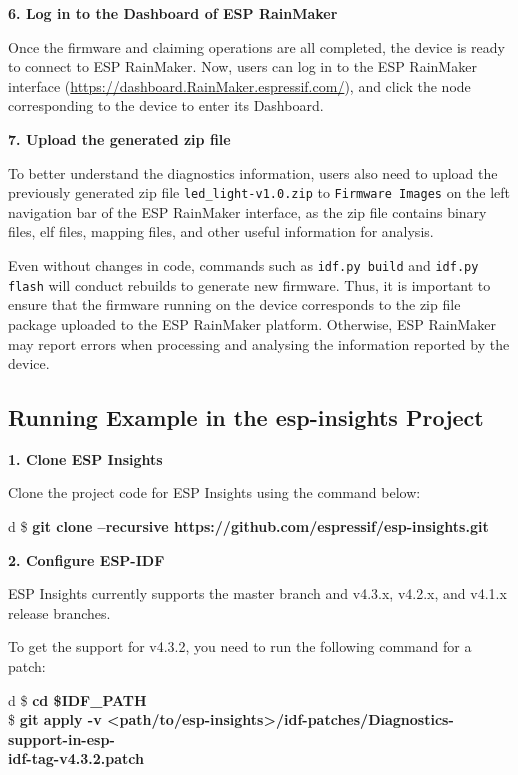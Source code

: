 \documentclass[a4paper,12pt]{book}
\begin{document}
\textbf{6. Log in to the Dashboard of ESP RainMaker}

Once the firmware and claiming operations are all completed, the device is ready to connect to ESP RainMaker. Now, users can log in to the ESP RainMaker interface (\url{https://dashboard.RainMaker.espressif.com/}), and click the node corresponding to the device to enter its Dashboard.

\textbf{7. Upload the generated zip file}

To better understand the diagnostics information, users also need to upload the previously generated zip file \verb|led_light-v1.0.zip| to \verb|Firmware Images| on the left navigation bar of the ESP RainMaker interface, as the zip file contains binary files, elf files, mapping files, and other useful information for analysis.

Even without changes in code, commands such as \verb|idf.py build| and \verb|idf.py flash| will conduct rebuilds to generate new firmware. Thus, it is important to ensure that the firmware running on the device corresponds to the zip file package uploaded to the ESP RainMaker platform. Otherwise, ESP RainMaker may report errors when processing and analysing the information reported by the device.

\subsection{Running Example in the esp-insights Project}

\textbf{1. Clone ESP Insights}

Clone the project code for ESP Insights using the command below:

\begin{codebloc}
\begin{tabular}{d}
\$ \textbf{git clone --recursive https://github.com/espressif/esp-insights.git}
\end{tabular}
\end{codebloc}

\textbf{2. Configure ESP-IDF}

ESP Insights currently supports the master branch and v4.3.x, v4.2.x, and v4.1.x release branches.

To get the support for v4.3.2, you need to run the following command for a patch:

\begin{codebloc}
\begin{tabular}{d}
\$ \textbf{cd \$IDF\_PATH}\\
\$ \textbf{git apply -v <path/to/esp-insights>/idf-patches/Diagnostics-support-in-esp-}\\
\textbf{idf-tag-v4.3.2.patch}
\end{tabular}
\end{codebloc}
\end{document}
